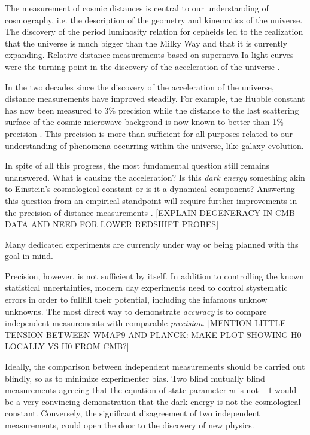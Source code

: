 The measurement of cosmic distances is central to our understanding of
cosmography, i.e. the description of the geometry and kinematics of
the universe. The discovery of the period luminosity relation for
cepheids led to the realization that the universe is much bigger than
the Milky Way and that it is currently expanding. Relative distance
measurements based on supernova Ia light curves were the turning point
in the discovery of the acceleration of the universe
\citep{Riess:1998p21184,Per++99}.

In the two decades since the discovery of the acceleration of the
universe, distance measurements have improved steadily. For example,
the Hubble constant has now been measured to 3\% precision
\citep{Rie++11,Fre++12}
while the distance to the last scattering surface of the cosmic
microwave backgrond is now known to better than 1\% precision
\cite{WMAP9,Planck15}. This precision is more than sufficient for all purposes
related to our understanding of phenomena occurring within the
universe, like galaxy evolution.

In spite of all this progress, the most fundamental question still
remains unanswered. What is causing the acceleration? Is this {\it
dark energy} something akin to Einstein's cosmological constant or is
it a dynamical component? Answering this question from an empirical
standpoint will require further improvements in the precision of
distance measurements \citep{Wei++13}.  [EXPLAIN DEGENERACY IN CMB
DATA AND NEED FOR LOWER REDSHIFT PROBES]

Many dedicated experiments are currently under way or being planned
with ths goal in mind.

Precision, however, is not sufficient by itself. In addition to
controlling the known statistical uncertainties, modern day
experiments need to control stystematic errors in order to fullfill
their potential, including the infamous unknow unknowns. The most
direct way to demonstrate {\it accuracy} is to compare independent
measurements with comparable {\it precision}. [MENTION LITTLE TENSION
BETWEEN WMAP9 AND PLANCK: MAKE PLOT SHOWING H0 LOCALLY VS H0 FROM CMB?]

Ideally, the comparison between independent measurements should be
carried out blindly, so as to minimize experimenter bias. Two blind
mutually blind measurements agreeing that the equation of state
parameter $w$ is not $-1$ would be a very convincing demonstration
that the dark energy is not the cosmological constant. Conversely, the
significant disagreement of two independent measurements, could open
the door to the discovery of new physics.

